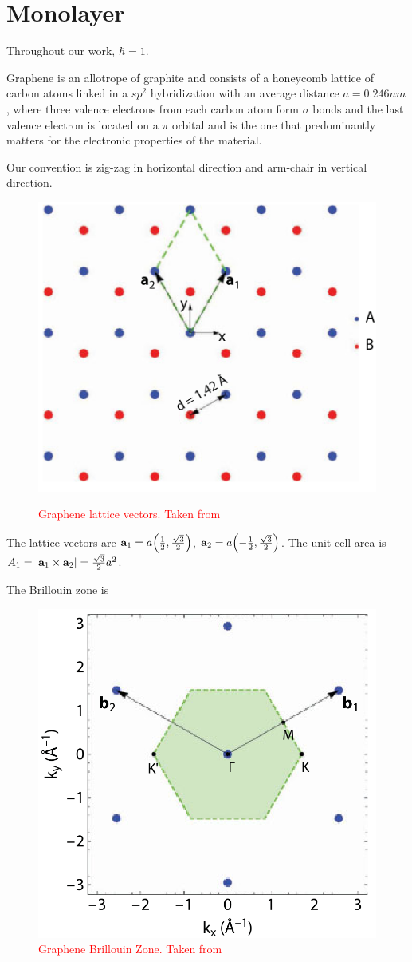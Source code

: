 \section{Monolayer}

Throughout our work, $\hbar = 1$.

\n

Graphene is an allotrope of graphite and consists of a honeycomb lattice of carbon atoms linked in a $sp^2$ hybridization with an average distance $a = 0.246 \unit{nm}$, where three valence electrons from each carbon atom form $\sigma$ bonds and the last valence electron is located on a $\pi$ orbital and is the one that predominantly matters for the electronic properties of the material.

\n

Our convention is zig-zag in horizontal direction and arm-chair in vertical direction.

\begin{figure}[H]
\centering
\includegraphics[width=0.4\linewidth]{fig/graphene-lattice_vectors2.png}
\label{fig:graphene-lattice_vectors}
\caption{\textcolor{red}{Graphene lattice vectors. Taken from \cite{handbook2019}}}
\end{figure}

The lattice vectors are $\vb{a}_1 = a \qty(\frac{1}{2}, \frac{\sqrt{3}}{2})$, $\vb{a}_2 = a \qty(-\frac{1}{2}, \frac{\sqrt{3}}{2})$. The unit cell area is $ A_1 = \abs{{\vb{a}}_1 \times {\vb{a}}_2} = \frac{\sqrt{3}}{2} a^2 $.

The Brillouin zone is
\begin{figure}[H]
\centering
\includegraphics[width=0.3\linewidth]{fig/brillouin-zone-monolayer.png}
\caption{\textcolor{red}{Graphene Brillouin Zone. Taken from \cite{handbook2019}}}
\label{fig:brillouin-zone-monolayer}
\end{figure}

